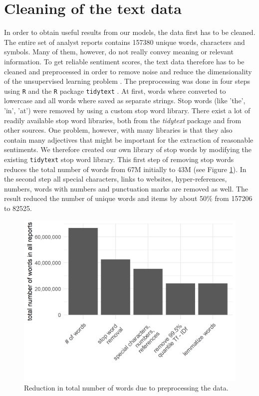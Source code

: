 \section{Cleaning of the text data}\label{cleaningText}
In order to obtain useful results from our models, the data first has to be cleaned. The entire set of analyst reports contains 157380 unique words, characters and symbols. Many of them, however, do not really convey meaning or relevant information. To get reliable sentiment scores, the text data therefore has to be cleaned and preprocessed in order to remove noise and reduce the dimensionality of the unsupervised learning problem \citep{HADDI201326}. The preprocessing was done in four steps using \texttt{R} \citep{Rproject} and the \texttt{R} package \texttt{tidytext} \citep{tidytext}. At first, words where converted to lowercase and all words where saved as separate strings. Stop words (like 'the', 'in', 'at') were removed by using a custom stop word library. There exist a lot of readily available stop word libraries, both from the \textit{tidytext} package and from other sources. One problem, however, with many libraries is that they also contain many adjectives that might be important for the extraction of reasonable sentiments. We therefore created our own library of stop words by modifying the existing \texttt{tidytext} stop word library. This first step of removing stop words reduces the total number of words from 67M initially to 43M (see Figure \ref{fig:TotWord}). In the second step all special characters, links to websites, hyper-references, numbers, words with numbers and punctuation marks are removed as well. The result reduced the number of unique words and items by about 50\% from 157206 to 82525.  \\ 

\begin{figure}[h]
\centering
\includegraphics[width=\textwidth]{figures/ReductionInTotalNWords.png}
\caption{Reduction in total number of words due to preprocessing the data.}
\label{fig:TotWord}
\end{figure}


